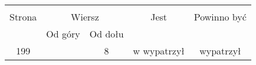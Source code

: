 \documentclass[a4paper,11pt]{article}
\begin{document}
\vspace{\spaceOne}





\begin{center}
  \begin{tabular}{|c|c|c|c|c|}
    \hline
    & \multicolumn{2}{c|}{} & & \\
    Strona & \multicolumn{2}{c|}{Wiersz} & Jest
                              & Powinno być \\ \cline{2-3}
    & Od góry & Od dołu & & \\
    \hline
    199 & &  8 & w wypatrzył & wypatrzył \\
    \hline
  \end{tabular}
\end{center}

\vspace{\spaceOne}










{}






\end{document}
